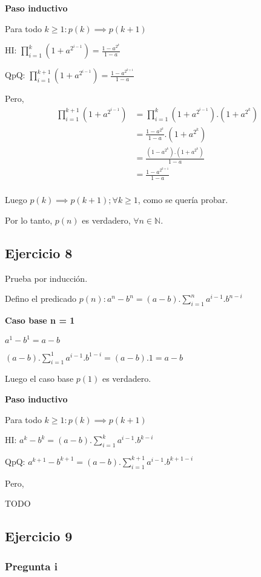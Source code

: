 \textbf{Paso inductivo}

Para todo $k \geq 1: p(k) \implies p(k+1)$

HI: $\prod_{i=1}^{k}\left(1+a^{2^{i-1}}\right)= \frac{1-a^{2^k}}{1-a}$

QpQ: $\prod_{i=1}^{k+1}\left(1+a^{2^{i-1}}\right)= \frac{1-a^{2^{k+1}}}{1-a}$

Pero,
\begin{align*}
    \prod_{i=1}^{k+1}\left(1+a^{2^{i-1}}\right) &= \prod_{i=1}^{k}\left(1+a^{2^{i-1}}\right) . (1+a^{2^k}) \\
    &= \frac{1-a^{2^k}}{1-a} . (1+a^{2^k}) \\
    &= \frac{\left(1-a^{2^k}\right).\left(1+a^{2^k}\right)}{1-a} \\
    &= \frac{1-a^{2^{k+1}}}{1-a} \\
\end{align*}

Luego $p(k) \implies p(k+1); \forall k \geq 1$, como se quería probar.

Por lo tanto, $p(n)$ es verdadero, $\forall n \in \mathbb{N}$.

\subsection{Ejercicio 8}

Prueba por inducción.

Defino el predicado $p(n) : a^n - b^n = (a-b).\sum_{i=1}^{n}a^{i-1}.b^{n-i}$

\textbf{Caso base n = 1}

$ a^1 - b^1 = a-b$

$ (a-b).\sum_{i=1}^{1}a^{i-1}.b^{1-i} = (a-b).1 = a-b$

Luego el caso base $p(1)$ es verdadero.

\textbf{Paso inductivo}

Para todo $k \geq 1: p(k) \implies p(k+1)$

HI: $a^k - b^k = (a-b).\sum_{i=1}^{k}a^{i-1}.b^{k-i}$

QpQ: $a^{k+1} - b^{k+1} = (a-b).\sum_{i=1}^{k+1}a^{i-1}.b^{k+1-i}$

Pero,

TODO
\subsection{Ejercicio 9}

\subsubsection{Pregunta i}

